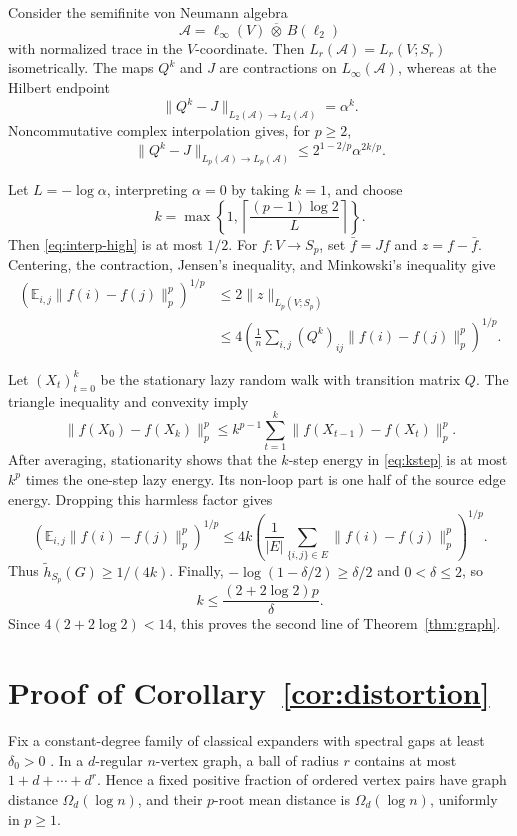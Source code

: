 \documentclass[11pt]{article}
\newcommand{\E}{\mathbb E}
\begin{document}
Consider the semifinite von Neumann algebra
\[
 \mathcal A=\ell_\infty(V)\,\overline\otimes\,B(\ell_2)
\]
with normalized trace in the $V$-coordinate.  Then
$L_r(\mathcal A)=L_r(V;S_r)$ isometrically.  The maps $Q^k$ and $J$
are contractions on $L_\infty(\mathcal A)$, whereas at the Hilbert
endpoint
\[
 \|Q^k-J\|_{L_2(\mathcal A)\to L_2(\mathcal A)}=\alpha^k.
\]
Noncommutative complex interpolation \cite{kosaki} gives, for $p\ge2$,
\begin{equation}\label{eq:interp-high}
 \|Q^k-J\|_{L_p(\mathcal A)\to L_p(\mathcal A)}
 \le2^{1-2/p}\alpha^{2k/p}.
\end{equation}

Let $L=-\log\alpha$, interpreting $\alpha=0$ by taking $k=1$, and
choose
\[
 k=\max\left\{1,
 \left\lceil\frac{(p-1)\log2}{L}\right\rceil\right\}.
\]
Then \eqref{eq:interp-high} is at most $1/2$.  For $f:V\to S_p$, set
$\bar f=Jf$ and $z=f-\bar f$.  Centering, the contraction, Jensen's
inequality, and Minkowski's inequality give
\begin{align}
 \left(\E_{i,j}\|f(i)-f(j)\|_p^p\right)^{1/p}
 &\le2\|z\|_{L_p(V;S_p)}\nonumber\\
 &\le4\left(\frac1n\sum_{i,j}(Q^k)_{ij}
       \|f(i)-f(j)\|_p^p\right)^{1/p}.\label{eq:kstep}
\end{align}

Let $(X_t)_{t=0}^k$ be the stationary lazy random walk with transition
matrix $Q$.  The triangle inequality and convexity imply
\[
 \|f(X_0)-f(X_k)\|_p^p
 \le k^{p-1}\sum_{t=1}^k
       \|f(X_{t-1})-f(X_t)\|_p^p.
\]
After averaging, stationarity shows that the $k$-step energy in
\eqref{eq:kstep} is at most $k^p$ times the one-step lazy energy.  Its
non-loop part is one half of the source edge energy.  Dropping this harmless
factor gives
\[
 \left(\E_{i,j}\|f(i)-f(j)\|_p^p\right)^{1/p}
 \le4k\left(\frac1{|E|}\sum_{\{i,j\}\in E}
       \|f(i)-f(j)\|_p^p\right)^{1/p}.
\]
Thus $\widetilde h_{S_p}(G)\ge1/(4k)$.  Finally,
$-\log(1-\delta/2)\ge\delta/2$ and $0<\delta\le2$, so
\[
 k\le\frac{(2+2\log2)p}{\delta}.
\]
Since $4(2+2\log2)<14$, this proves the second line of
Theorem~\ref{thm:graph}.

\section{Proof of Corollary~\ref{cor:distortion}}

Fix a constant-degree family of classical expanders with spectral gaps at
least $\delta_0>0$ \cite{hlw}.  In a $d$-regular $n$-vertex graph, a
ball of radius $r$ contains at most $1+d+\cdots+d^r$.  Hence a fixed
positive fraction of ordered vertex pairs have graph distance
$\Omega_d(\log n)$, and their $p$-root mean distance is
$\Omega_d(\log n)$, uniformly in $p\ge1$.
\end{document}
